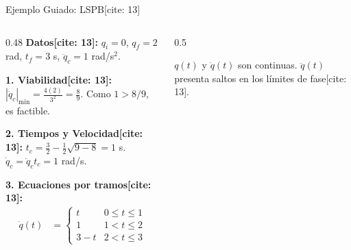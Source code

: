 \documentclass[aspectratio=169, xcolor={table,xcdraw}]{beamer}
\begin{document}
\begin{frame}{Ejemplo Guiado: LSPB[cite: 13]}
    \begin{columns}[T]
        \begin{column}{0.48\textwidth}
            \textbf{Datos[cite: 13]:}
            $q_i=0$, $q_f=2$ rad, $t_f=3$ s, $\ddot{q}_c=1$ rad/s$^2$.
            
            \vspace{0.2cm}
            \textbf{1. Viabilidad[cite: 13]:}
            $|\ddot{q}_c|_{\min} = \frac{4(2)}{3^2} = \frac{8}{9}$. Como $1 > 8/9$, es factible.
            
            \vspace{0.2cm}
            \textbf{2. Tiempos y Velocidad[cite: 13]:}
            $t_c = \frac{3}{2} - \frac{1}{2}\sqrt{9-8} = 1$ s. \\
            $\dot{q}_c = \ddot{q}_c t_c = 1$ rad/s.
            
            \vspace{0.2cm}
            \textbf{3. Ecuaciones por tramos[cite: 13]:}
            \begin{align*}
                \dot{q}(t) &= \begin{cases} t & 0 \le t \le 1 \\ 1 & 1 < t \le 2 \\ 3-t & 2 < t \le 3 \end{cases}
            \end{align*}
        \end{column}
        \begin{column}{0.5\textwidth}
            \centering
            
            \footnotesize $q(t)$ y $\dot{q}(t)$ son continuas. $\ddot{q}(t)$ presenta saltos en los límites de fase[cite: 13].
        \end{column}
    \end{columns}
\end{frame}
\end{document}
